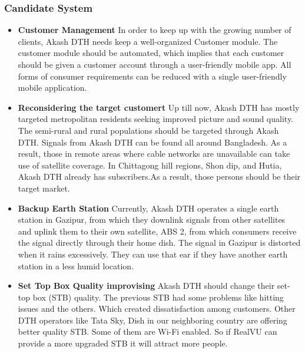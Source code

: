 \begin{spacing}{1}
\subsubsection{Candidate System}
\begin{itemize}
\item {\bf  Customer Management } \newline In order to keep up with the growing number of clients, Akash DTH needs keep a well-organized Customer module. The customer module should be automated, which implies that each customer should be given a customer account through a user-friendly mobile app. All forms of consumer requirements can be reduced with a single user-friendly mobile application.
\item {\bf  Reconsidering the target customert } \newline Up till now, Akash DTH has mostly targeted metropolitan residents seeking improved picture and sound quality. The semi-rural and rural populations should be targeted through Akash DTH. Signals from Akash DTH can be found all around Bangladesh. As a result, those in remote areas where cable networks are unavailable can take use of satellite coverage. In Chittagong hill regions, Shon dip, and Hutia, Akash DTH already has subscribers.As a result, those persons should be their target market.
\item {\bf Backup Earth Station } \newline Currently, Akash DTH operates a single earth station in Gazipur, from which they downlink signals from other satellites and uplink them to their own satellite, ABS 2, from which consumers receive the signal directly through their home dish. The signal in Gazipur is distorted when it rains excessively. They can use that ear if they have another earth station in a less humid location.

\item {\bf  Set Top Box Quality improvising} \newline Akash DTH should change their set-top box (STB) quality. The previous STB had some problems like hitting issues and the others. Which created dissatisfaction among customers. Other DTH operators like Tata Sky, Dish in our neighboring country are offering better quality STB. Some of them are Wi-Fi enabled. So if RealVU can provide a more upgraded STB it will attract more people.
\end{itemize}


\end{spacing}
